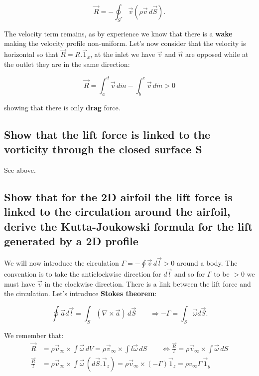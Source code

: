 \documentclass[british,french,11pt, a4paper, openany]{article}
\begin{document}
\begin{equation}
\vec{R} = -\oint _{S^*} \vec{v} (\rho \vec{v} \, d\vec{S}).
\end{equation}

The velocity term remains, as by experience we know that there is a \textbf{wake} making the velocity profile non-uniform. Let's now consider that the velocity is horizontal so that $\vec{R} = R.\vec{1}_x$, at the inlet we have $\vec{v}$ and $\vec{n}$ are opposed while at the outlet they are in the same direction: 

\begin{equation}
\vec{R} = \int _a^d \vec{v}\, d\dot{m} - \int _b^e \vec{v}\, d\dot{m} > 0
\end{equation}

showing that there is only \textbf{drag} force.

\subsection{Show that the lift force is linked to the vorticity through the closed surface S}
See above.
\subsection{Show that for the 2D airfoil the lift force is linked to the circulation around the airfoil, derive the Kutta-Joukowski formula for the lift generated by a 2D profile}

We will now introduce the circulation $\Gamma = - \oint \vec{v} \, d\vec{l} >0$   around a body. The convention is to take the anticlockwise direction for $d\vec{l}$ and so for $\Gamma$ to be $>0$ we must have $\vec{v}$ in the clockwise direction. There is a link between the lift force and the circulation. Let's introduce \textbf{Stokes theorem}:

\begin{equation}
\oint \vec{a} d\vec{l} = \int _S (\nabla \times \vec{a})\, d\vec{S} \qquad \Rightarrow -\Gamma = \int _S \vec{\omega} d\vec{S}.
\end{equation}

We remember that:
\begin{equation}
\begin{aligned}
\vec{R} &= \rho \vec{v}_\infty \times \int  \vec{\omega}\, dV = \rho \vec{v}_\infty \times \int  l\vec{\omega}\, dS \qquad \Leftrightarrow \frac{\vec{R}}{l} = \rho \vec{v}_\infty \times \int  \vec{\omega}\, dS \\
\frac{\vec{R}}{l}&= \rho \vec{v}_\infty \times \int  \vec{\omega}\, (d\vec{S}.\vec{1}_z) = \rho \vec{v}_\infty \times (-\Gamma)\vec{1}_z = \rho v_\infty \Gamma \,\vec{1}_y
\end{aligned}
\end{equation}
\end{document}
